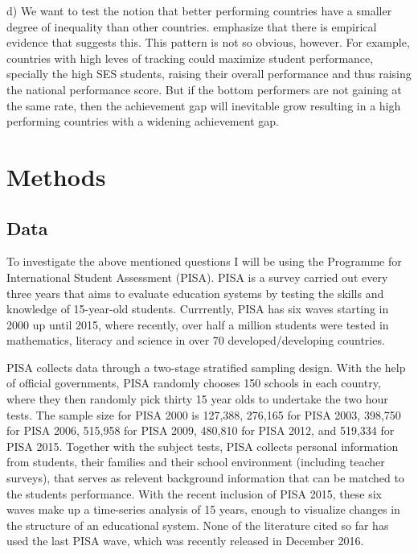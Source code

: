 \documentclass[11pt, a4paper]{article}\usepackage[]{graphicx}\usepackage[]{color}
\begin{document}
d) We want to test the notion that better performing countries have a smaller degree of inequality than other countries. \citet{werfhorst_mijs} emphasize that there is empirical evidence that suggests this. This pattern is not so obvious, however. For example, countries with high leves of tracking could maximize student performance, specially the high SES students, raising their overall performance and thus raising the national performance score. But if the bottom performers are not gaining at the same rate, then the achievement gap will inevitable grow resulting in a high performing countries with a widening achievement gap.

\section{Methods}

\subsection{Data}



To investigate the above mentioned questions I will be using the Programme for International Student Assessment (PISA). PISA is a survey carried out every three years that aims to evaluate education systems by testing the skills and knowledge of 15-year-old students. Currrently, PISA has six waves starting in 2000 up until 2015, where recently, over half a million students were tested in mathematics, literacy and science in over 70 developed/developing countries.

PISA collects data through a two-stage stratified sampling design. With the help of official governments, PISA randomly chooses 150 schools in each country, where they then randomly pick thirty 15 year olds to undertake the two hour tests. The sample size for PISA 2000 is 127,388, 276,165 for PISA 2003, 398,750 for PISA 2006, 515,958 for PISA 2009, 480,810 for PISA 2012, and 519,334 for PISA 2015. Together with the subject tests, PISA collects personal information from students, their families and their school environment (including teacher surveys), that serves as relevent background information that can be matched to the students performance. With the recent inclusion of PISA 2015, these six waves make up a time-series analysis of 15 years, enough to visualize changes in the structure of an educational system. None of the literature cited so far has used the last PISA wave, which was recently released in December 2016.
\end{document}
